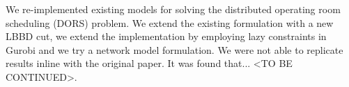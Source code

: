 We re-implemented existing models\cite{roshanaei2017propagating} for solving the distributed operating room scheduling (DORS) problem. We extend the existing formulation with a new LBBD cut, we extend the implementation by employing lazy constraints in Gurobi and we try a network model formulation. We were not able to replicate results inline with the original paper. It was found that... <TO BE CONTINUED>. %